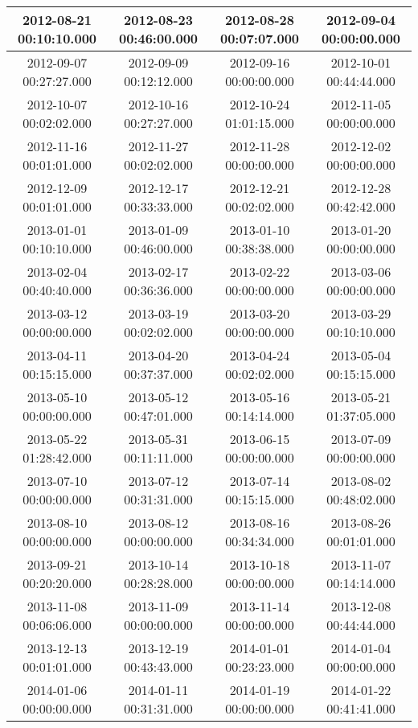 \begin{longtable}{c c c c}
2012-08-21 00:10:10.000 & 
2012-08-23 00:46:00.000 & 
2012-08-28 00:07:07.000 & 
2012-09-04 00:00:00.000 \\ \midrule
2012-09-07 00:27:27.000 & 
2012-09-09 00:12:12.000 & 
2012-09-16 00:00:00.000 & 
2012-10-01 00:44:44.000 \\ \midrule
2012-10-07 00:02:02.000 & 
2012-10-16 00:27:27.000 & 
2012-10-24 01:01:15.000 & 
2012-11-05 00:00:00.000 \\ \midrule
2012-11-16 00:01:01.000 & 
2012-11-27 00:02:02.000 & 
2012-11-28 00:00:00.000 & 
2012-12-02 00:00:00.000 \\ \midrule
2012-12-09 00:01:01.000 & 
2012-12-17 00:33:33.000 & 
2012-12-21 00:02:02.000 & 
2012-12-28 00:42:42.000 \\ \midrule
2013-01-01 00:10:10.000 & 
2013-01-09 00:46:00.000 & 
2013-01-10 00:38:38.000 & 
2013-01-20 00:00:00.000 \\ \midrule
2013-02-04 00:40:40.000 & 
2013-02-17 00:36:36.000 & 
2013-02-22 00:00:00.000 & 
2013-03-06 00:00:00.000 \\ \midrule
2013-03-12 00:00:00.000 & 
2013-03-19 00:02:02.000 & 
2013-03-20 00:00:00.000 & 
2013-03-29 00:10:10.000 \\ \midrule
2013-04-11 00:15:15.000 & 
2013-04-20 00:37:37.000 & 
2013-04-24 00:02:02.000 & 
2013-05-04 00:15:15.000 \\ \midrule
2013-05-10 00:00:00.000 & 
2013-05-12 00:47:01.000 & 
2013-05-16 00:14:14.000 & 
2013-05-21 01:37:05.000 \\ \midrule
2013-05-22 01:28:42.000 & 
2013-05-31 00:11:11.000 & 
2013-06-15 00:00:00.000 & 
2013-07-09 00:00:00.000 \\ \midrule
2013-07-10 00:00:00.000 & 
2013-07-12 00:31:31.000 & 
2013-07-14 00:15:15.000 & 
2013-08-02 00:48:02.000 \\ \midrule
2013-08-10 00:00:00.000 & 
2013-08-12 00:00:00.000 & 
2013-08-16 00:34:34.000 & 
2013-08-26 00:01:01.000 \\ \midrule
2013-09-21 00:20:20.000 & 
2013-10-14 00:28:28.000 & 
2013-10-18 00:00:00.000 & 
2013-11-07 00:14:14.000 \\ \midrule
2013-11-08 00:06:06.000 & 
2013-11-09 00:00:00.000 & 
2013-11-14 00:00:00.000 & 
2013-12-08 00:44:44.000 \\ \midrule
2013-12-13 00:01:01.000 & 
2013-12-19 00:43:43.000 & 
2014-01-01 00:23:23.000 & 
2014-01-04 00:00:00.000 \\ \midrule
2014-01-06 00:00:00.000 & 
2014-01-11 00:31:31.000 & 
2014-01-19 00:00:00.000 & 
2014-01-22 00:41:41.000 \\ \midrule

\end{longtable}
